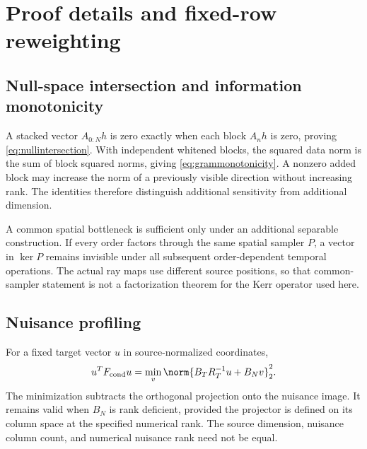 \section{Proof details and fixed-row reweighting}\label{app:reweight}
\subsection{Null-space intersection and information monotonicity}
A stacked vector $A_{0:N}h$ is zero exactly when each block $A_nh$ is zero, proving \eqref{eq:nullintersection}. With independent whitened blocks, the squared data norm is the sum of block squared norms, giving \eqref{eq:grammonotonicity}. A nonzero added block may increase the norm of a previously visible direction without increasing rank. The identities therefore distinguish additional sensitivity from additional dimension.

A common spatial bottleneck is sufficient only under an additional separable construction. If every order factors through the same spatial sampler $P$, a vector in $\ker P$ remains invisible under all subsequent order-dependent temporal operations. The actual ray maps use different source positions, so that common-sampler statement is not a factorization theorem for the Kerr operator used here.

\subsection{Nuisance profiling}
For a fixed target vector $u$ in source-normalized coordinates,
\begin{equation}
u^TF_{\rm cond}u=\min_v\norm{B_TR_T^{-1}u+B_Nv}_2^2.
\label{eq:minnuisance}
\end{equation}
The minimization subtracts the orthogonal projection onto the nuisance image. It remains valid when $B_N$ is rank deficient, provided the projector is defined on its column space at the specified numerical rank. The source dimension, nuisance column count, and numerical nuisance rank need not be equal.

